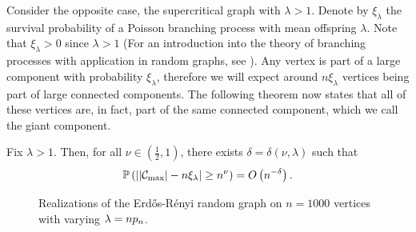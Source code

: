 \bigskip

Consider the opposite case, the supercritical graph with $\lambda > 1$.
Denote by $\xi_\lambda$ the survival probability of a Poisson branching process with mean offspring $\lambda$.
Note that $\xi_\lambda > 0$ since $\lambda > 1$
(For an introduction into the theory of branching processes with application in random graphs, 
see \cite[Chapter 3, p.87ff.]{vanderHofstad.2016}).
Any vertex is part of a large component with probability $\xi_\lambda$, 
therefore we will expect around $n \xi_\lambda$ vertices being part of large connected components.
The following theorem now states that all of these vertices are, in fact, part of the same connected component, which we call the giant component.

\begin{theorem}
	Fix $\lambda>1$.
	Then, for all $\nu \in (\frac{1}{2}, 1)$, there exists $\delta = \delta(\nu, \lambda)$ such that
	\begin{equation}
		\mathbb{P}\left( \left| |\mathcal{C}_{\max}| - n \xi_\lambda \right| \geq n^{\nu}\right) = O\left(n^{-\delta}\right).
	\end{equation}
\end{theorem}

\begin{figure}[h]
	\centering
	\quad
	\caption{Realizations of the Erd\H{o}s-Rényi random graph on $n=1000$ vertices with varying $\lambda = n p_n$.}%
	\label{F: ER lambda}%
\end{figure}

